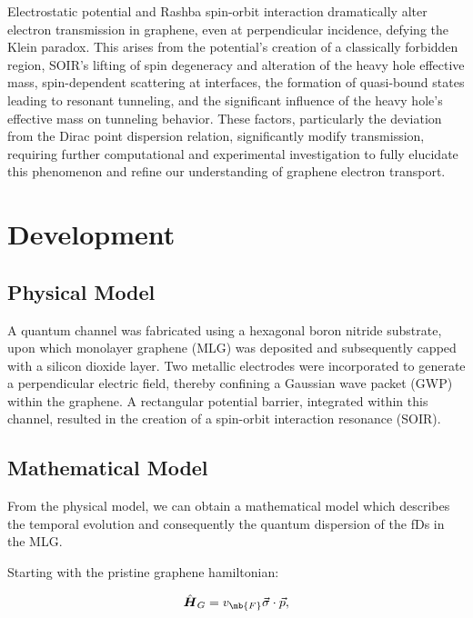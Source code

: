 \documentclass[twocolumn]{revtex4-2}
\newcommand{\bn}[1]{\mbox{\boldmath $#1$}}
\begin{document}
    Electrostatic potential and Rashba spin-orbit interaction dramatically alter electron transmission in graphene, even at perpendicular incidence, defying the Klein paradox.
     This arises from the potential's creation of a classically forbidden region, SOIR's lifting of spin degeneracy and alteration of the heavy hole effective mass, spin-dependent scattering at interfaces, the formation of quasi-bound states leading to resonant tunneling, and the significant influence of the heavy hole's effective mass on tunneling behavior.
      These factors, particularly the deviation from the Dirac point dispersion relation, significantly modify transmission, requiring further computational and experimental investigation to fully elucidate this phenomenon and refine our understanding of graphene electron transport.

    \section{Development}\label{sec:development}

    \subsection{Physical Model}\label{subsec:physical-model}

    A quantum channel was fabricated using a hexagonal boron nitride substrate, upon which monolayer graphene (MLG) was deposited and subsequently capped with a silicon dioxide layer.
     Two metallic electrodes were incorporated to generate a perpendicular electric field, thereby confining a Gaussian wave packet (GWP) within the graphene.
      A rectangular potential barrier, integrated within this channel, resulted in the creation of a spin-orbit interaction resonance (SOIR).


    \subsection{Mathematical Model}\label{subsec:mathematical-model}

    From the physical model, we can obtain a mathematical model which describes the temporal evolution and consequently the quantum dispersion of the fDs in the MLG.

    Starting with the pristine graphene hamiltonian\cite{Geimk2007}:

    \begin{equation}
        \label{eq:pristGr}
        \hat{\bn{H}}_G = v_{\mb{\tiny F}}\vec{\mathbf{\sigma}}\cdot\vec{p},
    \end{equation}
\end{document}
